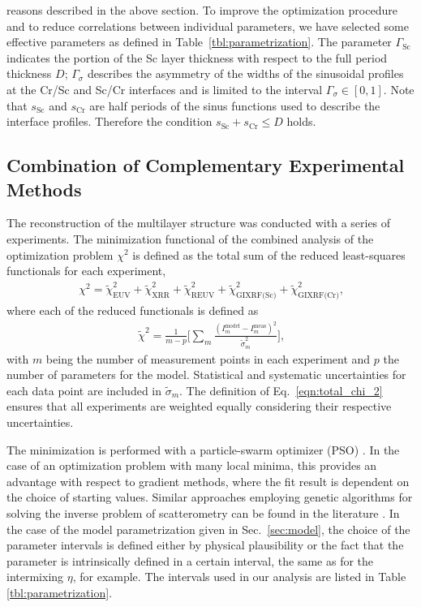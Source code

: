 reasons described in the above section. To improve the optimization procedure 
and to reduce correlations between individual parameters, we have selected some 
effective parameters as defined in Table~\ref{tbl:parametrization}. The 
parameter $\Gamma_\text{Sc}$ indicates the portion of the Sc layer thickness 
with respect to the full period thickness $D$; $\Gamma_\sigma$ describes the 
asymmetry of the widths of the sinusoidal profiles at the Cr/Sc and Sc/Cr 
interfaces and is limited to the interval $\Gamma_\sigma \in [0,1]$. Note that 
$s_\text{Sc}$ and $s_\text{Cr}$ are half periods of the sinus functions used to 
describe the interface profiles. Therefore the condition $s_\text{Sc} + 
s_\text{Cr} \leq D$ holds.

\subsection{Combination of Complementary Experimental Methods}
The reconstruction of the multilayer structure was conducted with a series of 
experiments. The minimization functional of the combined analysis of the 
optimization problem $\chi^2$ is defined as the total sum of the reduced 
least-squares functionals for each experiment,
\begin{align}
\chi^2 = \tilde{\chi}^2_\text{EUV} +\tilde{\chi}^2_\text{XRR} 
+\tilde{\chi}^2_\text{REUV} + 
\tilde{\chi}^2_\text{GIXRF(Sc)}+\tilde{\chi}^2_\text{GIXRF(Cr)}\text{,} 
\label{eqn:total_chi_2}
\end{align}
where each of the reduced functionals is defined as
\begin{align}
\tilde{\chi}^2 = \frac{1}{m - p} \bigg[\sum\limits_{m} \frac{(I_m^\text{model} 
- I_m^\text{meas})^2}{\tilde{\sigma}_m^2} \bigg] \text{,} 
\label{eqn:reduced_chi_2}
\end{align}
with $m$ being the number of measurement points in each experiment and $p$ the 
number of parameters for the model. Statistical and systematic uncertainties 
for each data point are included in $\tilde{\sigma}_m$. The definition of 
Eq.~\eqref{eqn:total_chi_2} ensures that all experiments are weighted equally 
considering their respective uncertainties.

The minimization is performed with a particle-swarm optimizer (PSO) 
\cite{kennedy_particle_2011}. In the case of an optimization problem with many local 
minima, this provides an advantage with respect to gradient methods, where the 
fit result is dependent on the choice of starting values. Similar approaches 
employing genetic algorithms for solving the inverse problem of scatterometry 
can be found in the literature \cite{del_rio_modeling_2000}. In the case of the model 
parametrization given in Sec.~\ref{sec:model}, the choice of the parameter 
intervals is defined either by physical plausibility or the fact that the 
parameter is intrinsically defined in a certain interval, the same as for the 
intermixing $\eta$, for example. The intervals used in our analysis are listed 
in Table \ref{tbl:parametrization}.

